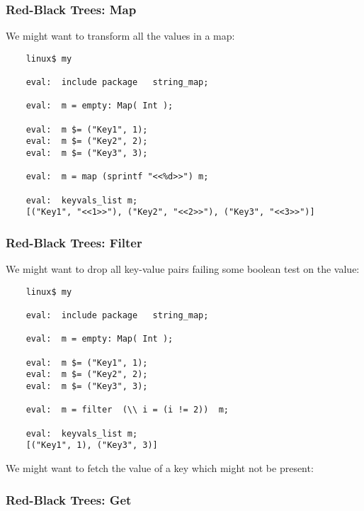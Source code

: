 \cutend*

\subsubsection{Red-Black Trees:  Map}

We might want to transform all the values in a map:

\begin{verbatim}
    linux$ my

    eval:  include package   string_map;

    eval:  m = empty: Map( Int );

    eval:  m $= ("Key1", 1);
    eval:  m $= ("Key2", 2);
    eval:  m $= ("Key3", 3);

    eval:  m = map (sprintf "<<%d>>") m;

    eval:  keyvals_list m;
    [("Key1", "<<1>>"), ("Key2", "<<2>>"), ("Key3", "<<3>>")]
\end{verbatim}

\cutend*

\subsubsection{Red-Black Trees:  Filter}

We might want to drop all key-value pairs 
failing some boolean test on the value:

\begin{verbatim}
    linux$ my

    eval:  include package   string_map;

    eval:  m = empty: Map( Int );

    eval:  m $= ("Key1", 1);
    eval:  m $= ("Key2", 2);
    eval:  m $= ("Key3", 3);

    eval:  m = filter  (\\ i = (i != 2))  m;

    eval:  keyvals_list m;
    [("Key1", 1), ("Key3", 3)]
\end{verbatim}

We might want to fetch the value of a key 
which might not be present:


\cutend*

\subsubsection{Red-Black Trees:  Get}

